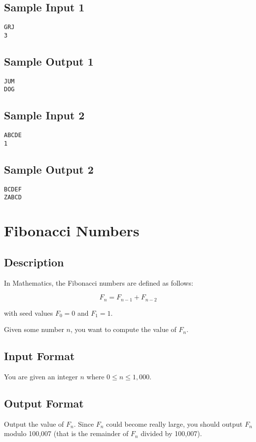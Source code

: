 \subsection*{Sample Input 1}
\begin{verbatim}
GRJ
3
\end{verbatim}
\subsection*{Sample Output 1}
\begin{verbatim}
JUM
DOG
\end{verbatim}

\subsection*{Sample Input 2}
\begin{verbatim}
ABCDE
1
\end{verbatim}
\subsection*{Sample Output 2}
\begin{verbatim}
BCDEF
ZABCD
\end{verbatim}


\newpage

\section{Fibonacci Numbers}
\subsection*{Description}
In Mathematics, the Fibonacci numbers are defined as follows:

\begin{equation*}
F_n = F_{n-1} + F_{n-2}
\end{equation*}

with seed values $F_0 = 0$ and $F_1 = 1$. 

Given some number $n$, you want to compute the value of $F_n$. 

\subsection*{Input Format}
You are given an integer $n$ where $0 \leq n \leq 1,000$. 

\subsection*{Output Format}
Output the value of $F_n$.  Since $F_n$ could become really large, you should output $F_n$ modulo 100,007 (that is the remainder of $F_n$ divided by 100,007).

